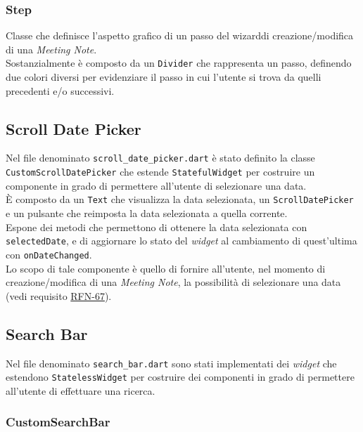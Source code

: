 \subsubsection*{Step}
\label{subsubsec:step}

Classe che definisce l'aspetto grafico di un passo del \gls{wizard}\glsoccur di creazione/modifica di una \emph{Meeting Note}.\\
Sostanzialmente è composto da un \lstinline{Divider}\cite{site:divider} che rappresenta un passo, definendo due colori diversi per evidenziare il passo in cui l'utente si trova da quelli precedenti e/o successivi.

\subsection{Scroll Date Picker}
\label{subsec:scroll-date-picker}

Nel file denominato \lstinline{scroll_date_picker.dart} è stato definito la classe \lstinline{CustomScrollDatePicker} che estende \lstinline{StatefulWidget} per costruire un componente in grado di permettere all'utente di selezionare una data.\\
È composto da un \lstinline{Text}\cite{site:text} che visualizza la data selezionata, un \lstinline{ScrollDatePicker}\cite{site:scroll-date-picker} e un pulsante che reimposta la data selezionata a quella corrente.\\
Espone dei metodi che permettono di ottenere la data selezionata con \lstinline{selectedDate}, e di aggiornare lo stato del \emph{widget} al cambiamento di quest'ultima con \lstinline{onDateChanged}.\\
Lo scopo di tale componente è quello di fornire all'utente, nel momento di creazione/modifica di una \emph{Meeting Note}, la possibilità di selezionare una data (vedi requisito \hyperref[RFN-67]{RFN-67}).

\subsection{Search Bar}
\label{subsec:search-bar}

Nel file denominato \lstinline{search_bar.dart} sono stati implementati dei \emph{widget} che estendono \lstinline{StatelessWidget} per costruire dei componenti in grado di permettere all'utente di effettuare una ricerca.

\subsubsection*{CustomSearchBar}
\label{subsubsec:custom-search-bar}

